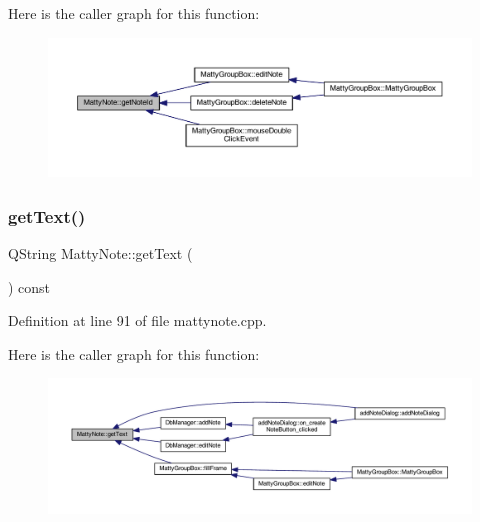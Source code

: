 Here is the caller graph for this function\+:
\nopagebreak
\begin{figure}[H]
\begin{center}
\leavevmode
\includegraphics[width=350pt]{classMattyNote_a4ee4be12260363aa33a72cb40e19d2ed_icgraph}
\end{center}
\end{figure}
\hypertarget{classMattyNote_abced4f72489e13f7a06c70e473858cdc}{}\label{classMattyNote_abced4f72489e13f7a06c70e473858cdc} 
\subsubsection{\texorpdfstring{get\+Text()}{getText()}}
{\footnotesize\ttfamily Q\+String Matty\+Note\+::get\+Text (\begin{DoxyParamCaption}{ }\end{DoxyParamCaption}) const}



Definition at line 91 of file mattynote.\+cpp.

Here is the caller graph for this function\+:
\nopagebreak
\begin{figure}[H]
\begin{center}
\leavevmode
\includegraphics[width=350pt]{classMattyNote_abced4f72489e13f7a06c70e473858cdc_icgraph}
\end{center}
\end{figure}
\hypertarget{classMattyNote_a2205505ded709f404d995884a8d34c4a}{}\label{classMattyNote_a2205505ded709f404d995884a8d34c4a} 
